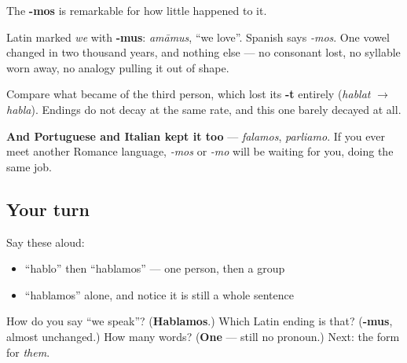 \begin{cousinweb}
The \textbf{-mos} is remarkable for how little happened to it.

Latin marked \emph{we} with \textbf{-mus}: \emph{amāmus}, \textquotedblleft{}we love\textquotedblright{}. Spanish says \emph{-mos}. One vowel changed in two thousand years, and nothing else — no consonant lost, no syllable worn away, no analogy pulling it out of shape.

Compare what became of the third person, which lost its \textbf{-t} entirely (\emph{hablat} $\to$ \emph{habla}). Endings do not decay at the same rate, and this one barely decayed at all.

\textbf{And Portuguese and Italian kept it too} — \emph{falamos}, \emph{parliamo}. If you ever meet another Romance language, \emph{-mos} or \emph{-mo} will be waiting for you, doing the same job.
\end{cousinweb}

\subsection*{Your turn}
Say these aloud:

\begin{itemize}
\raggedright
  \item \textquotedblleft{}hablo\textquotedblright{} then \textquotedblleft{}hablamos\textquotedblright{} — one person, then a group
  \item \textquotedblleft{}hablamos\textquotedblright{} alone, and notice it is still a whole sentence
\end{itemize}

\begin{tcolorbox}[breakable,colback=teal!4,colframe=teal!35!black,title={Before you move on}]
How do you say \textquotedblleft{}we speak\textquotedblright{}? (\textbf{Hablamos}.) Which Latin ending is that? (\textbf{-mus}, almost unchanged.) How many words? (\textbf{One} — still no pronoun.) Next: the form for \emph{them}.
\end{tcolorbox}

